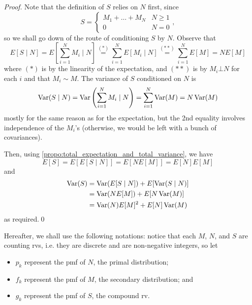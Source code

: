 \documentclass[notoc,notitlepage]{tufte-book}
\begin{document}
\begin{proof}
  Note that the definition of $S$ relies on $N$ first, since
  \begin{equation*}
    S = \begin{cases}
      M_1 + \hdots + M_N & N \geq 1 \\
      0                  & N = 0
    \end{cases},
  \end{equation*}
  so we shall go down of the route of conditioning $S$ by $N$. Observe that
  \begin{equation*}
    E [ S \mid N ] = E \left[ \sum_{i=1}^{N} M_i \mid N \right] \overset{(*)}{=} \sum_{i=1}^{N} E [ M_i \mid N ] \overset{(**)}{=} \sum_{i=1}^{N} E[M] = N E[M]
  \end{equation*}
  where $(*)$ is by the linearity of the expectation, and $(**)$ is by $M_i \bot N$ for each $i$ and that $M_i \sim M$. The variance of $S$ conditioned on $N$ is
  \begin{equation*}
    \operatorname{Var}(S \mid N) = \operatorname{Var} \left( \sum_{i=1}^{N} M_i \mid N \right) = \sum_{i=1}^{N} \operatorname{Var}(M) = N\operatorname{Var}(M)
  \end{equation*}
  mostly for the same reason as for the expectation, but the 2nd equality involves independence of the $M_i$'s (otherwise, we would be left with a bunch of covariances).

  Then, using \cref{propo:total_expectation_and_total_variance}, we have
  \begin{equation*}
    E[S] = E[ E [ S \mid N ] ] = E [ N E[M] ] = E[N]E[M]
  \end{equation*}
  and
  \begin{align*}
    \operatorname{Var}(S) &= \operatorname{Var}(E[S \mid N]) + E[\operatorname{Var}(S \mid N)] \\
            &= \operatorname{Var}( N E[M] ) + E[ N \operatorname{Var}(M) ] \\
            &= \operatorname{Var}(N)E[M]^2 + E[N]\operatorname{Var}(M)
  \end{align*}
  as required.\qed\
\end{proof}

\begin{note}[Notation]
  Hereafter, we shall use the following notations: notice that each $M$, $N$, and $S$ are counting rvs, i.e. they are discrete and are non-negative integers, so let
  \begin{itemize}
    \item $p_k$ represent the pmf of $N$, the primal distribution;
    \item $f_k$ represent the pmf of $M$, the secondary distribution; and
    \item $g_k$ represent the pmf of $S$, the compound rv.
  \end{itemize}
\end{note}
\end{document}
